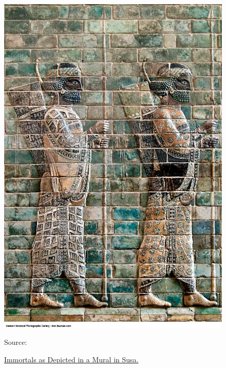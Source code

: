 \documentclass[twoside, a4paper, 12pt]{article}
\newcommand{\source}[1]{\caption*{Source: {#1}} }
\begin{document}
\begin{figure}
  \centering
  \includegraphics[width=\linewidth]{ImmortalsSusa.jpg}
  \captionsetup{justification=raggedright}
  \caption{\ul{Immortals as Depicted in a Mural in Susa.}}
  \source{\cite{iranian_historical_photography}}
  \label{img:ImmortalSusa}
\end{figure}

\par\vspace{1em}
\end{document}
